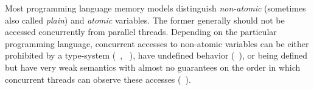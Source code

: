 
Most programming language memory models distinguish 
\emph{non-atomic} (sometimes also called \emph{plain})
and \emph{atomic} variables. 
The former generally should not be accessed 
concurrently from parallel threads. 
Depending on the particular programming language, 
concurrent accesses to non-atomic variables 
can be either prohibited by a type-system 
(\eg \Haskell~\cite{Marlow-al:Haskell10, Vollmer-al:PPoPP17}, \Rust~\cite{RustBook:19}), 
have undefined behavior (\eg \CPP~\cite{Boehm-Adve:PLDI08, Batty-al:POPL11}), 
or being defined but have very weak semantics with almost 
no guarantees on the order in which concurrent
threads can observe these accesses (\eg \Java~\cite{Manson-al:POPL05}).

